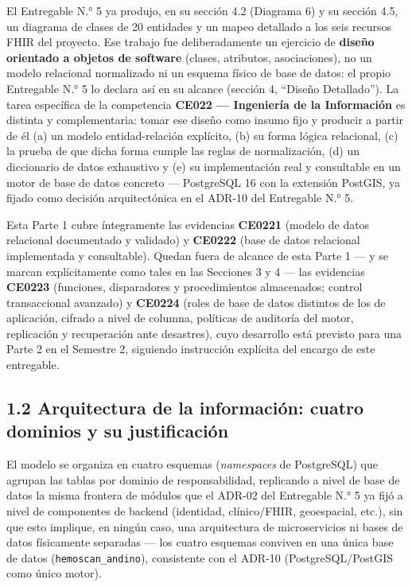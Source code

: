 \documentclass[11pt,a4paper]{article}
\begin{document}
El Entregable N.° 5 ya produjo, en su sección 4.2 (Diagrama 6) y su sección 4.5, un diagrama de clases de 20 entidades y un mapeo detallado a los seis recursos FHIR del proyecto. Ese trabajo fue deliberadamente un ejercicio de \textbf{diseño orientado a objetos de software} (clases, atributos, asociaciones), no un modelo relacional normalizado ni un esquema físico de base de datos: el propio Entregable N.° 5 lo declara así en su alcance (sección 4, ``Diseño Detallado''). La tarea específica de la competencia \textbf{CE022 --- Ingeniería de la Información} es distinta y complementaria: tomar ese diseño como insumo fijo y producir a partir de él (a) un modelo entidad-relación explícito, (b) su forma lógica relacional, (c) la prueba de que dicha forma cumple las reglas de normalización, (d) un diccionario de datos exhaustivo y (e) su implementación real y consultable en un motor de base de datos concreto --- PostgreSQL 16 con la extensión PostGIS, ya fijado como decisión arquitectónica en el ADR-10 del Entregable N.° 5.

Esta Parte 1 cubre íntegramente las evidencias \textbf{CE0221} (modelo de datos relacional documentado y validado) y \textbf{CE0222} (base de datos relacional implementada y consultable). Quedan fuera de alcance de esta Parte 1 --- y se marcan explícitamente como tales en las Secciones 3 y 4 --- las evidencias \textbf{CE0223} (funciones, disparadores y procedimientos almacenados; control transaccional avanzado) y \textbf{CE0224} (roles de base de datos distintos de los de aplicación, cifrado a nivel de columna, políticas de auditoría del motor, replicación y recuperación ante desastres), cuyo desarrollo está previsto para una Parte 2 en el Semestre 2, siguiendo instrucción explícita del encargo de este entregable.

\subsection{1.2 Arquitectura de la información: cuatro dominios y su justificación}\label{arquitectura-de-la-informaciuxf3n-cuatro-dominios-y-su-justificaciuxf3n}

El modelo se organiza en cuatro esquemas (\emph{namespaces} de PostgreSQL) que agrupan las tablas por dominio de responsabilidad, replicando a nivel de base de datos la misma frontera de módulos que el ADR-02 del Entregable N.° 5 ya fijó a nivel de componentes de backend (identidad, clínico/FHIR, geoespacial, etc.), sin que esto implique, en ningún caso, una arquitectura de microservicios ni bases de datos físicamente separadas --- los cuatro esquemas conviven en una única base de datos (\texttt{hemoscan\_andino}), consistente con el ADR-10 (PostgreSQL/PostGIS como único motor).
\end{document}
